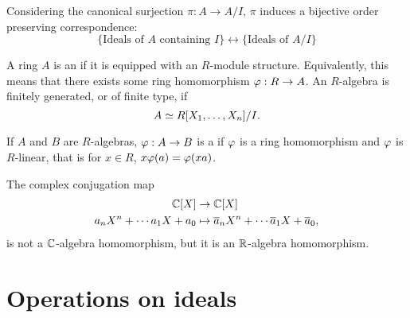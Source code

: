 \documentclass{ximera}
\begin{document}
\begin{theorem}\label{T:corr}
  Considering the canonical surjection $\pi:A \to A/I$, $\pi$ induces
  a bijective order preserving correspondence:
  \[
  \{\text{Ideals of $A$ containing $I$}\} \longleftrightarrow \{\text{Ideals of $A/I$}\} 
  \]
\end{theorem}








\begin{definition} A ring $A$ is an  if it is equipped with an $R$-module structure. Equivalently, this means that there exists some ring homomorphism $\varphi:R\to A$. An $R$-algebra is finitely generated, or of finite type, if 
\[
A \simeq R[X_1,\dots,X_n]/I.
\]
\end{definition}

\begin{definition} If $A$ and $B$ are $R$-algebras, $\varphi:A\to B$ is a  if $\varphi$ is a ring homomorphism and $\varphi$ is $R$-linear, that is for $x\in R$, $x\varphi(a) = \varphi(xa)$.
\end{definition}


\begin{example} The complex conjugation map
\begin{align*}
\mathbb C[X] &\to \mathbb C[X]\\
a_nX^n + \cdots a_1X + a_0 &\mapsto \overline{a}_nX^n + \cdots \overline{a}_1X + \overline{a}_0, 
\end{align*}
is not a $\mathbb C$-algebra homomorphism, but it is an $\mathbb R$-algebra homomorphism.
\end{example}



\section{Operations on ideals}
\end{document}
